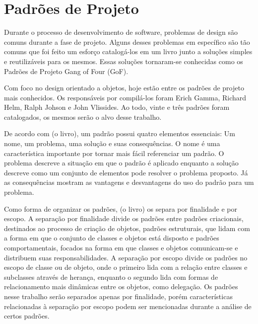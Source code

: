 \chapter{Padrões de Projeto}

Durante o processo de desenvolvimento de software, 
problemas de design são comuns durante a 
fase de projeto. Alguns desses problemas em específico 
são tão comuns que foi feito um esforço catalogá-los em 
um livro junto a soluções simples e reutilizáveis para 
os mesmos. Essas soluções tornaram-se conhecidas como 
os Padrões de Projeto Gang of Four (GoF).

Com foco no design orientado a objetos, hoje estão 
entre os padrões de 
projeto mais conhecidos. Os responsáveis por compilá-los  
foram Erich Gamma, Richard Helm, 
Ralph Johson e John Vlissides. Ao todo, vinte e três 
padrões foram catalogados, os mesmos serão o alvo desse 
trabalho.

De acordo com (o livro), um padrão possui quatro elementos 
essenciais: Um nome, um problema, uma solução e suas 
consequências. O nome é uma característica importante 
por tornar mais fácil referenciar um padrão. O problema 
descreve a situação em que o padrão é aplicado enquanto 
a solução descreve como um conjunto de elementos pode 
resolver o problema proposto. Já as consequências 
mostram as vantagens e desvantagens do uso do padrão 
para um problema.

Como forma de organizar os padrões, (o livro) os separa 
por finalidade e por escopo. A separação por finalidade 
divide os padrões entre padrões criacionais, 
destinados ao processo de criação de objetos, padrões 
estruturais, que lidam com a forma em que o conjunto de 
classes e objetos está disposto e padrões comportamentais, 
focados na forma em que classes e objetos comunicam-se 
e distribuem suas responsabilidades. A separação por 
escopo divide os padrões no escopo de classe ou de objeto, 
onde o primeiro lida com a relação entre classes e 
subclasses através de herança, enquanto o segundo lida 
com formas de relacionamento mais dinâmicas entre os 
objetos, como delegação. Os padrões nesse trabalho 
serão separados apenas por finalidade, porém 
características relacionadas à separação por escopo 
podem ser mencionadas durante a análise de certos 
padrões.

